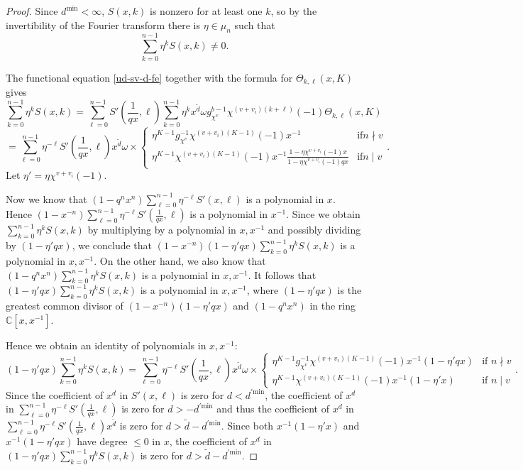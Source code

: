 \documentclass[11pt,letterpaper]{article}
\theoremstyle{definition}
\theoremstyle{remark}
\numberwithin{equation}{section}
\theoremstyle{dotless}
\renewcommand{\tilde}{\widetilde}
\begin{document}
\begin{proof} Since $d^{\mathrm{min}}<\infty$,  $S(x,k) $ is nonzero for at least one $k$, so by the invertibility of the Fourier transform there is $\eta\in \mu_n$ such that 
\begin{equation}\label{d-Snonzero}  \sum_{k =0}^{n-1} \eta^{k} S(x,k) \neq 0.\end{equation}

The functional equation \eqref{ud-sv-d-fe} together with the formula for $\Theta_{k,\ell}(x, K)$ gives
\[\sum_{k =0}^{n-1} \eta^{k} S(x,k)  =\sum_{\ell=0}^{n-1} S'(\frac{1}{qx} ,\ell) \sum_{k=0}^{n-1} \eta^k x^{\tilde{d}}   \omega g_{\chi^v}^{b-1} \chi^{(v+v_i)(k+\ell)}(-1)  \Theta_{k,\ell}(x, K) \] \[ =   \sum_{\ell =0}^{n-1} \eta^{-\ell}S' (\frac{1}{qx} ,\ell)  x^{ \tilde{d}}  \omega \times \begin{cases} \eta^{K-1}  g_{\chi^v}^{-1} \chi^{(v+v_i)(K-1) }(-1)x^{-1} & \mathrm{if } n\nmid v\\ \eta^{K-1}   \chi^{(v+v_i) (K-1)} (-1) x^{-1} \frac{1 -\eta \chi^{v+v_i}(-1)  x}{ 1- \eta \chi^{v+v_i}(-1)  qx } & \mathrm{if } n \mid v\end{cases}.  \]
Let $\eta' = \eta \chi^{v+v_i}(-1)$. 

 Now we know that $(1-q^n x^n) \sum_{\ell =0}^{n-1} \eta^{-\ell}S' (x,\ell)$ is a polynomial in $x$. Hence $(1-x^{-n} ) \sum_{\ell =0}^{n-1} \eta^{-\ell}S' (\frac{1}{qx} ,\ell)$ is a polynomial in $x^{-1}$. Since we obtain  $\sum_{k =0}^{n-1} \eta^{k} S(x,k)$ by multiplying by a polynomial in $x,x^{-1}$ and possibly dividing by $(1- \eta' qx)$, we conclude that $(1-x^{-n})(1-\eta' qx) \sum_{k =0}^{n-1} \eta^{k} S(x,k)$ is a polynomial in $x, x^{-1}$. On the other hand, we also know that $(1-q^n x^n)  \sum_{k =0}^{n-1} \eta^{k} S(x,k)$ is a polynomial in $x,x^{-1}$. It follows that $(1- \eta' q x)  \sum_{k =0}^{n-1} \eta^{k} S(x,k)$ is a polynomial in $x,x^{-1}$, where $(1-\eta' q x)$ is the greatest common divisor of $(1-x^{-n})(1-\eta' qx) $ and $(1-q^nx^n)$ in the ring $\mathbb C[x,x^{-1}]$. 

Hence we obtain an identity of polynomials in $x,x^{-1}$:
\[ (1-\eta' qx) \sum_{k =0}^{n-1} \eta^{k} S(x,k) =  \sum_{\ell =0}^{n-1} \eta^{-\ell}S' (\frac{1}{qx} ,\ell)  x^{ \tilde{d}}  \omega \times \begin{cases} \eta^{K-1}  g_{\chi^v}^{-1} \chi^{(v+v_i)(K-1) }(-1) x^{-1} (1- \eta' q x)  & \textrm{if } n\nmid v\\ \eta^{K-1}   \chi^{(v+v_i)  (K-1)}(-1) x^{-1} (1 -\eta' x) & \textrm{if } n \mid v\end{cases}.\]
Since the coefficient of $x^d$ in $S'(x,\ell)$ is zero for $d< d^{'\mathrm{min}}$, the coefficient of $x^d$ in  $\sum_{\ell =0}^{n-1} \eta^{-\ell}S' (\frac{1}{qx} ,\ell)$ is zero for $d> - d^{'\mathrm{min}}$ and thus the coefficient of $x^d$ in  $\sum_{\ell =0}^{n-1} \eta^{-\ell}S' (\frac{1}{qx} ,\ell)  x^{ \tilde{d}}$ is zero for $d> \tilde{d}- d^{'\mathrm{min}}$. Since both $x^{-1} (1 -\eta' x)$ and $x^{-1} (1 -\eta' q x)$ have degree $\leq 0$ in $x$, the coefficient of $x^d$ in $(1-\eta' qx) \sum_{k =0}^{n-1} \eta^{k} S(x,k) $ is zero for $d > \tilde{d}- d^{'\mathrm{min}}$.


\end{proof}
\end{document}
